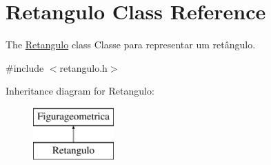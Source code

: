 \hypertarget{class_retangulo}{}\section{Retangulo Class Reference}
\label{class_retangulo}


The \mbox{\hyperlink{class_retangulo}{Retangulo}} class Classe para representar um retângulo.  




{\ttfamily \#include $<$retangulo.\+h$>$}

Inheritance diagram for Retangulo\+:\begin{figure}[H]
\begin{center}
\leavevmode
\includegraphics[height=2.000000cm]{class_retangulo}
\end{center}
\end{figure}
